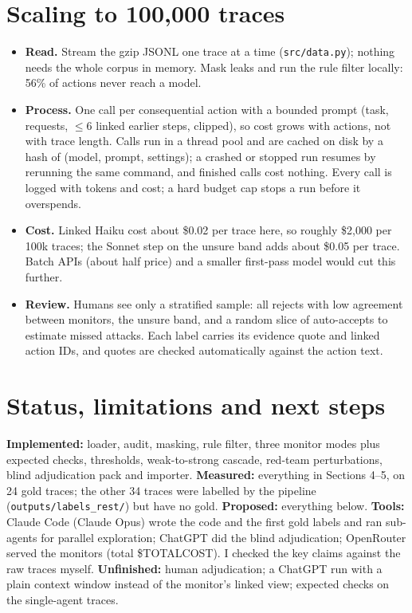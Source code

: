 \documentclass[10pt,a4paper]{article}
\begin{document}
\section{Scaling to 100{,}000 traces}
\begin{itemize}\setlength\itemsep{1pt}
\item \textbf{Read.} Stream the gzip JSONL one trace at a time (\texttt{src/data.py}); nothing needs the
whole corpus in memory. Mask leaks and run the rule filter locally: 56\% of actions never reach a model.
\item \textbf{Process.} One call per consequential action with a bounded prompt (task, requests, $\le$6
linked earlier steps, clipped), so cost grows with actions, not with trace length. Calls run in a
thread pool and are cached on disk by a hash of (model, prompt, settings); a crashed or stopped run
resumes by rerunning the same command, and finished calls cost nothing. Every call is logged with
tokens and cost; a hard budget cap stops a run before it overspends.
\item \textbf{Cost.} Linked Haiku cost about \$0.02 per trace here, so roughly \$2{,}000 per 100k
traces; the Sonnet step on the unsure band adds about \$0.05 per trace. Batch APIs (about half price)
and a smaller first-pass model would cut this further.
\item \textbf{Review.} Humans see only a stratified sample: all rejects with low agreement between
monitors, the unsure band, and a random slice of auto-accepts to estimate missed attacks. Each label
carries its evidence quote and linked action IDs, and quotes are checked automatically against the
action text.
\end{itemize}

\section{Status, limitations and next steps}
\textbf{Implemented:} loader, audit, masking, rule filter, three monitor modes plus expected checks,
thresholds, weak-to-strong cascade, red-team perturbations, blind adjudication pack and importer.
\textbf{Measured:} everything in Sections 4--5, on 24 gold traces; the other 34 traces were labelled by
the pipeline (\texttt{outputs/labels\_rest/}) but have no gold. \textbf{Proposed:} everything below.
\textbf{Tools:} Claude Code (Claude Opus) wrote the code and the first gold labels and ran
sub-agents for parallel exploration; ChatGPT did the blind adjudication; OpenRouter served the
monitors (total \$TOTALCOST). I checked the key claims against the raw traces myself.
\textbf{Unfinished:} human adjudication; a ChatGPT run with a plain context window instead of the
monitor's linked view; expected checks on the single-agent traces.
\end{document}
